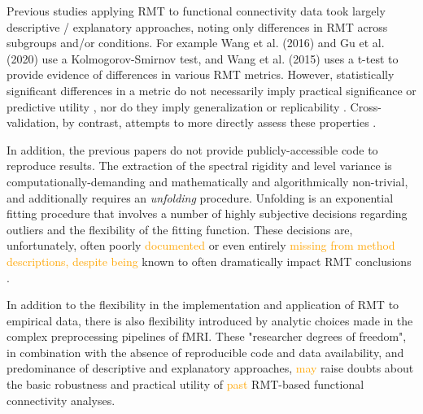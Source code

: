 \documentclass[12pt]{spieman}  %
\begin{document}
\begin{spacing}{2}
Previous studies applying RMT to functional connectivity
data\cite{wangRandomMatrixTheory2016, wangSpectralPropertiesTemporal2015a,
matharooSpontaneousBackpainAlters2020, guRandomMatrixTheory2020} took largely
descriptive / explanatory approaches, noting only differences in RMT across
subgroups and/or conditions. For example Wang et al.
(2016)\cite{wangRandomMatrixTheory2016} and Gu et al.
(2020)\cite{guRandomMatrixTheory2020} use a Kolmogorov-Smirnov test, and Wang
et al. (2015)\cite{wangSpectralPropertiesTemporal2015a} uses a t-test to
provide evidence of differences in various RMT metrics. However, statistically
significant differences in a metric do not necessarily imply practical
significance or predictive utility \cite{loWhySignificantVariables2015}, nor do
they imply generalization or replicability \cite{amrheinEarthFlat052017}.
Cross-validation, by contrast, attempts to more directly assess these
properties \cite{yarkoniChoosingPredictionExplanation2017}.

In addition, the previous papers do not provide publicly-accessible code to
reproduce results. The extraction of the spectral rigidity and level variance
is computationally-demanding and mathematically and algorithmically
non-trivial, and additionally requires an \textit{unfolding}
procedure\cite{guhrRandommatrixTheoriesQuantum1998a, mehtaRandomMatrices2004}.
Unfolding is an exponential fitting procedure that involves a number of highly
subjective decisions regarding outliers and the flexibility of the fitting
function. These decisions are, unfortunately, often poorly
\textcolor{orange}{documented} or even entirely \textcolor{orange}{missing from
method descriptions, despite being} known to often dramatically impact RMT
conclusions \cite{abul-magdUnfoldingSpectrumChaotic2014,
abueleninSpectralUnfoldingChaotic2018, fossionRandommatrixSpectraTime2013,
abueleninEffectUnfoldingSpectral2012, moralesImprovedUnfoldingDetrending2011}.

In addition to the flexibility in the implementation and application of RMT to
empirical data, there is also flexibility introduced by analytic choices made
in the complex preprocessing pipelines of
fMRI\cite{parkerBenefitSliceTiming2019}. These "researcher degrees of
freedom"\cite{simmonsFalsePositivePsychologyUndisclosed2011b}, in combination
with the absence of reproducible code and data availability, and predominance
of descriptive and explanatory approaches, \textcolor{orange}{may} raise doubts about the basic
robustness and practical utility of \textcolor{orange}{past} RMT-based functional connectivity analyses.


\end{spacing}
\end{document}

